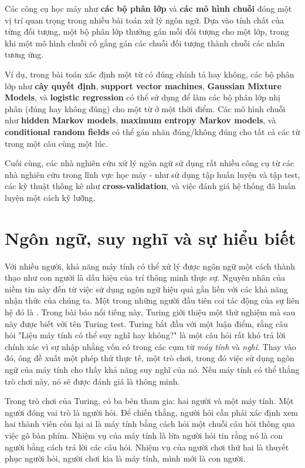 Các công cụ học máy như \textbf{các bộ phân lớp} và \textbf{các mô hình chuỗi} đóng một vị trí quan trọng trong nhiều bài toán xử lý ngôn ngữ. Dựa vào tính chất của từng đối tượng, một bộ phân lớp thường gán mỗi đối tượng cho một lớp, trong khi một mô hình chuỗi cố gắng gán các chuỗi đối tượng thành chuỗi các nhãn tương ứng.

Ví dụ, trong bài toán xác định một từ có đúng chính tả hay không, các bộ phân lớp như \textbf{cây quyết định}, \textbf{support vector machines}, \textbf{Gaussian Mixture Models}, và \textbf{logistic regression} có thể sử dụng để làm các bộ phân lớp nhị phân (đúng hay không đúng) cho một từ ở một thời điểm. Các mô hình chuỗi như \textbf{hidden Markov models}, \textbf{maximum entropy Markov models}, và \textbf{conditional random fields} có thể gán nhãn đúng/không đúng cho tất cả các từ trong một câu cùng một lúc.

Cuối cùng, các nhà nghiên cứu xử lý ngôn ngữ sử dụng rất nhiều công cụ từ các nhà nghiên cứu trong lĩnh vực học máy - như sử dụng tập huấn luyện và tập test, các kỹ thuật thống kê như \textbf{cross-validation}, và việc đánh giá hệ thống đã huấn luyện một cách kỹ lưỡng.

\section{Ngôn ngữ, suy nghĩ và sự hiểu biết}

Với nhiều người, khả năng máy tính có thể xử lý được ngôn ngữ một cách thành thạo như con người là dấu hiệu của trí thông minh thực sự. Nguyên nhân của niềm tin này đến từ việc sử dụng ngôn ngữ hiệu quả gắn liền với các khả năng nhận thức của chúng ta. Một trong những người đầu tiên coi tác động của sự liên hệ đó là \citet{machinery1950computing}. Trong bài báo nổi tiếng này, Turing giới thiệu một thử nghiệm mà sau này được biết với tên Turing test. Turing bắt đầu với một luận điểm, rằng câu hỏi "Liệu máy tính có thể suy nghĩ hay không?" là một câu hỏi rất khó trả lời chính xác vì sự nhập nhằng vốn có trong các cụm từ \textit{máy tính} và \textit{nghĩ}. Thay vào đó, ông đề xuất một phép thử thực tế, một trò chơi, trong đó việc sử dụng ngôn ngữ của máy tính cho thấy khả năng suy nghĩ của nó. Nếu máy tính có thể thắng trò chơi này, nó sẽ được đánh giá là thông minh.

Trong trò chơi của Turing, có ba bên tham gia: hai người và một máy tính. Một người đóng vai trò là người hỏi. Để chiến thắng, người hỏi cần phải xác định xem hai thành viên còn lại ai là máy tính bằng cách hỏi một chuỗi câu hỏi thông qua việc gõ bàn phím. Nhiệm vụ của máy tính là lừa người hỏi tin rằng nó là con người bằng cách trả lời các câu hỏi. Nhiệm vụ của người chơi thứ hai là thuyết phục người hỏi, người chơi kia là máy tính, mình mới là con người.

